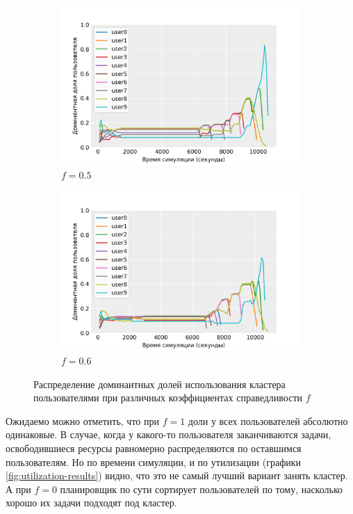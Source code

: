 \begin{figure}[h!]
    \begin{subfigure}{0.49\linewidth}
        \centering
        \includegraphics[width=\linewidth]{images/fair_share_05}
        \caption{$f = 0.5$}
        \label{fig:fair_share_05}
    \end{subfigure}
    \begin{subfigure}{0.49\linewidth}
        \centering
        \includegraphics[width=\linewidth]{images/fair_share_06}
        \caption{$f = 0.6$}
        \label{fig:fair_share_06}
    \end{subfigure}
    \caption{Распределение доминантных долей использования кластера пользователями при различных коэффициентах справедливости $f$}
    \label{fig:fairness-results}
\end{figure}

Ожидаемо можно отметить, что при $f = 1$ доли у всех пользователей абсолютно одинаковые. В случае, когда у какого-то пользователя заканчиваются задачи, освободившиеся ресурсы равномерно распределяются по оставшимся пользователям. Но по времени симуляции, и по утилизации (графики \ref{fig:utilization-results}) видно, что это не самый лучший вариант занять кластер. А при $f = 0$ планировщик по сути сортирует пользователей по тому, насколько хорошо их задачи подходят под кластер.

